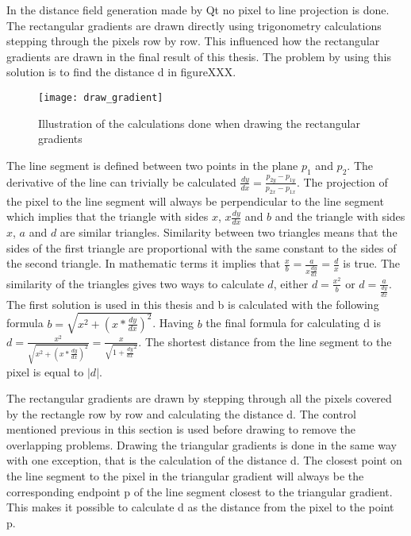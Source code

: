 In the distance field generation made by Qt no pixel to line projection is done. The rectangular gradients are drawn directly using trigonometry calculations stepping through the pixels row by row. This influenced how the rectangular gradients are drawn in the final result of this thesis. The problem by using this solution is to find the distance d in figureXXX.

\begin{figure}[H]
\texttt{[image: draw\_gradient]}
\caption{Illustration of the calculations done when drawing the rectangular gradients}
\end{figure}

The line segment is defined between two points in the plane $p_1$ and $p_2$. The derivative of the line can trivially be calculated $\frac{dy}{dx}=\frac{p_{2y}-p_{1y}}{p_{2x}-p_{1x}}$. The projection of the pixel to the line segment will always be perpendicular to the line segment which implies that the triangle with sides $x$, $x\frac{dy}{dx}$ and $b$ and the triangle with sides $x$, $a$ and $d$ are similar triangles. Similarity between two triangles means that the sides of the first triangle are proportional with the same constant to the sides of the second triangle. In mathematic terms it implies that $\frac{x}{b}=\frac{a}{x\frac{dy}{dx}}=\frac{d}{x}$ is true. The similarity of the triangles gives two ways to calculate $d$, either $d=\frac{x^2}{b}$ or $d=\frac{a}{\frac{dy}{dx}}$. The first solution is used in this thesis and b is calculated with the following formula $b=\sqrt{x^2+(x*\frac{dy}{dx})^2}$. Having $b$ the final formula for calculating d is $d=\frac{x^2}{\sqrt{x^2+(x*\frac{dy}{dx})^2}}=\frac{x}{\sqrt{1+\frac{dy}{dx}^2}}$. The shortest distance from the line segment to the pixel is equal to $|d|$.

The rectangular gradients are drawn by stepping through all the pixels covered by the rectangle row by row and calculating the distance d. The control mentioned previous in this section is used before drawing to remove the overlapping problems. Drawing the triangular gradients is done in the same way with one exception, that is the calculation of the distance d. The closest point on the line segment to the pixel in the triangular gradient will always be the corresponding endpoint p of the line segment closest to the triangular gradient. This makes it possible to calculate d as the distance from the pixel to the point p.

